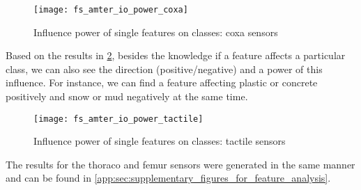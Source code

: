 \begin{figure}[H]
  \centering
  \texttt{[image: fs\_amter\_io\_power\_coxa]}
  \caption{Influence power of single features on classes: coxa sensors}
  \label{fig:pa_amter_io_power_coxa}
\end{figure}

Based on the results in \cref{fig:pa_amter_io_power_tactile}, besides the knowledge if a feature affects a particular class, we can also see the direction (positive/negative) and a power of this influence. For instance, we can find a feature affecting plastic or concrete positively and snow or mud negatively at the same time. 


\begin{figure}[H]
  \centering
  \texttt{[image: fs\_amter\_io\_power\_tactile]}
  \caption{Influence power of single features on classes: tactile sensors}
  \label{fig:pa_amter_io_power_tactile}
\end{figure}

The results for the thoraco and femur sensors were generated in the same manner and can be found in \cref{app:sec:supplementary_figures_for_feature_analysis}.
